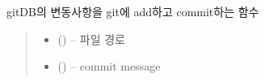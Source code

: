 \documentclass[a4paper,10pt,english]{sphinxmanual}
\begin{document}
\begin{fulllineitems}

\begin{fulllineitems}
\label{\detokenize{_VersionController:subscribeVC.commit}}
\pysigstartsignatures
{}
\pysigstopsignatures
\sphinxAtStartPar
gitDB의 변동사항을 git에 add하고 commit하는 함수
\begin{quote}\begin{description}
\begin{itemize}
\item {} 
\sphinxAtStartPar
{} () – 파일 경로

\item {} 
\sphinxAtStartPar
{} () – commit message

\end{itemize}

\end{description}\end{quote}

\end{fulllineitems}


\end{fulllineitems}




\renewcommand{\indexname}{색인}
\printindex
\end{document}
